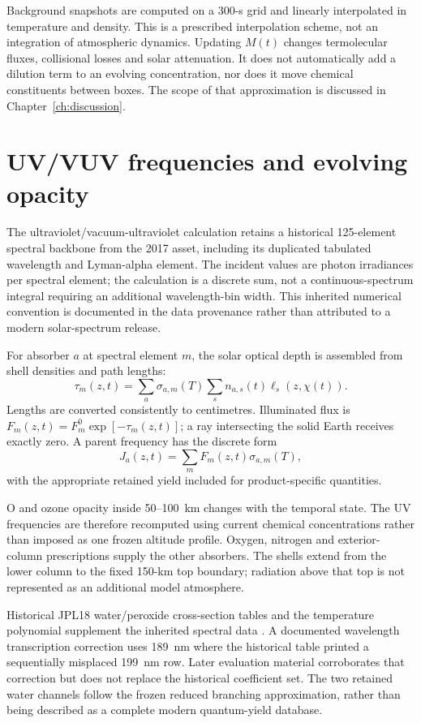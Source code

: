 Background snapshots are computed on a 300-s grid and linearly interpolated in temperature and density. This is a prescribed interpolation scheme, not an integration of atmospheric dynamics. Updating $M(t)$ changes termolecular fluxes, collisional losses and solar attenuation. It does not automatically add a dilution term to an evolving concentration, nor does it move chemical constituents between boxes. The scope of that approximation is discussed in Chapter~\ref{ch:discussion}.

\section{UV/VUV frequencies and evolving opacity}
The ultraviolet/vacuum-ultraviolet calculation retains a historical 125-element spectral backbone from the 2017 asset, including its duplicated tabulated wavelength and Lyman-alpha element. The incident values are photon irradiances per spectral element; the calculation is a discrete sum, not a continuous-spectrum integral requiring an additional wavelength-bin width. This inherited numerical convention is documented in the data provenance rather than attributed to a modern solar-spectrum release.

For absorber $a$ at spectral element $m$, the solar optical depth is assembled from shell densities and path lengths:
\begin{equation}\tau_m(z,t)=\sum_a\sigma_{a,m}(T)\sum_s n_{a,s}(t)\ell_s(z,\chi(t)).
\label{eq:tauUV}\end{equation}
Lengths are converted consistently to centimetres. Illuminated flux is $F_m(z,t)=F_m^0\exp[-\tau_m(z,t)]$; a ray intersecting the solid Earth receives exactly zero. A parent frequency has the discrete form
\begin{equation}J_a(z,t)=\sum_m F_m(z,t)\sigma_{a,m}(T),\label{eq:Jsum}\end{equation}
with the appropriate retained yield included for product-specific quantities.

O and ozone opacity inside 50--100~km changes with the temporal state. The UV frequencies are therefore recomputed using current chemical concentrations rather than imposed as one frozen altitude profile. Oxygen, nitrogen and exterior-column prescriptions supply the other absorbers. The shells extend from the lower column to the fixed 150-km top boundary; radiation above that top is not represented as an additional model atmosphere.

Historical JPL18 water/peroxide cross-section tables and the temperature polynomial supplement the inherited spectral data \citep{jpl18}. A documented wavelength transcription correction uses 189~nm where the historical table printed a sequentially misplaced 199~nm row. Later evaluation material corroborates that correction but does not replace the historical coefficient set. The two retained water channels follow the frozen reduced branching approximation, rather than being described as a complete modern quantum-yield database.

